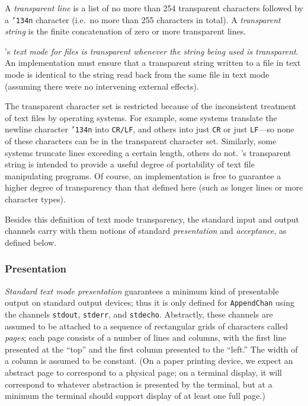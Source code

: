 A {\em transparent line} is a list of no more
than 254 transparent characters followed by a \mbox{\tt {\char'134}n} character (i.e.~no
more than 255
characters in total).  A {\em transparent string} is the finite concatenation of zero or more transparent lines.

\Haskell{}'s {\em text mode for files is transparent whenever the string
being used is transparent}.  An implementation must
ensure that a transparent string written to a file in text mode is
identical to the string read back from the same file in text mode
(assuming there were no intervening external effects).

The transparent character set is restricted because of
the inconsistent treatment of text files by operating systems.  For
example, some systems translate the newline character \mbox{\tt {\char'134}n} into
\mbox{\tt CR/LF}, and others into just \mbox{\tt CR} or just \mbox{\tt LF}---so none of these
characters can be in the transparent character set.  Similarly, some
systems truncate lines exceeding a certain length, others do not.
\Haskell{}'s transparent string is intended to provide a useful degree
of portability of text file manipulating programs.  Of course, an
implementation is free to guarantee a higher degree of transparency
than that defined here (such as longer lines or more character types).

Besides this definition of text mode transparency, the standard
input and output channels carry with them notions of standard {\em
presentation} and {\em acceptance}, as defined below.

\subsubsection{Presentation}
\label{presentation}

{\em Standard text mode presentation}
guarantees a minimum kind of presentable output on standard output
devices; thus it is only defined for \mbox{\tt AppendChan} using the channels
\mbox{\tt stdout}, \mbox{\tt stderr}, and \mbox{\tt stdecho}.  Abstractly, these channels are
assumed to be attached to a sequence of rectangular grids of
characters called {\em pages}; each page consists of a number of lines
and columns, with the first line presented at the ``top'' and the
first column presented to the ``left.''  The width of a column is
assumed to be constant.  (On a paper printing device, we expect an
abstract page to correspond to a physical page; on a terminal
display, it will correspond to whatever abstraction is presented by the
terminal, but at a minimum the terminal should support display of at
least one full page.)

